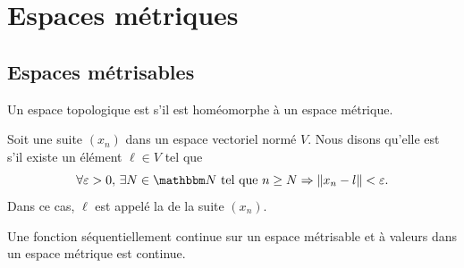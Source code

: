 
\section{Espaces métriques}

\subsection{Espaces métrisables}

\begin{definition}
    Un espace topologique est  s'il est homéomorphe à un espace métrique.
\end{definition}


\begin{definition}		\label{DefCvSuiteEGVN}
	Soit une suite $(x_n)$ dans un espace vectoriel normé $V$. Nous disons qu'elle est
     s'il existe un élément $\ell\in V$ tel que
	\begin{equation}
		\forall \varepsilon>0,\,\exists N\in\eN\tq n\geq N\Rightarrow \| x_n-l \|<\varepsilon.
	\end{equation}
	Dans ce cas, $\ell$ est appelé la  de la suite $(x_n)$.
\end{definition}


\begin{proposition} \label{PROPooKNVUooMbLZoy}
    Une fonction séquentiellement continue sur un espace métrisable et à valeurs dans un espace métrique est continue.
\end{proposition}


